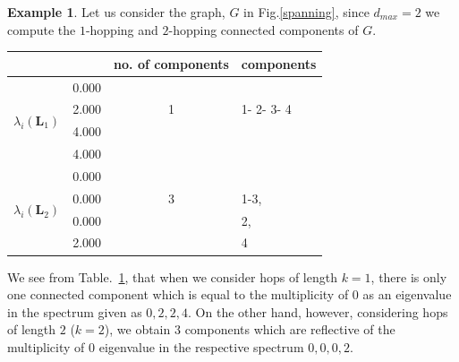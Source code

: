 \documentclass[10pt,a4paper]{article}
\theoremstyle{plain}
\theoremstyle{definition}
\newtheorem{exa}[subsection]{Example}
\begin{document}
    	    \begin{exa}
    	    	Let us consider the graph, $G$ in Fig.\ref{spanning}, since $d_{max} = 2$ we compute the $1$-hopping and $2$-hopping connected components of $G$.
    	    	
    	    	\begin{table}[H]
    	    		\centering
    	    		\begin{tabular}{ |l|l|c|l| }
    	    			\hline
    	    			& & no. of components & components \\
    	    			\hline
    	    			\multirow{4}{*}{$\lambda_i(\mathbf{L}_1)$} & $\mathbf{0.000}$& & \\
    	    			& 2.000& 1& 1- 2- 3- 4\\
    	    			& 4.000 & & \\
    	    			& 4.000 & & \\ \hline
    	    			\multirow{4}{*}{$\lambda_i(\mathbf{L}_2)$} & $\mathbf{0.000}$& & \\
    	    			& $\mathbf{0.000}$& 3 & 1-3,\\
    	    			& $\mathbf{0.000}$ &  & 2,\\
    	    			& 2.000 &  & 4\\
    	    			\hline
    	    		\end{tabular}
        		\label{table-components} 
    	    	\end{table}
    	    	We see from Table.~\ref{table-components}, that when we consider hops of length $k=1$, there is only one connected component which is equal to the multiplicity of $0$ as an eigenvalue in the spectrum given as ${0,2,2,4}$. On the other hand, however, considering hops of length $2$ ($k=2$), we obtain $3$ components which are reflective of the multiplicity of $0$ eigenvalue in the respective spectrum ${0,0,0,2}$.
    	    	
    	    \end{exa}
    	   
\end{document}
